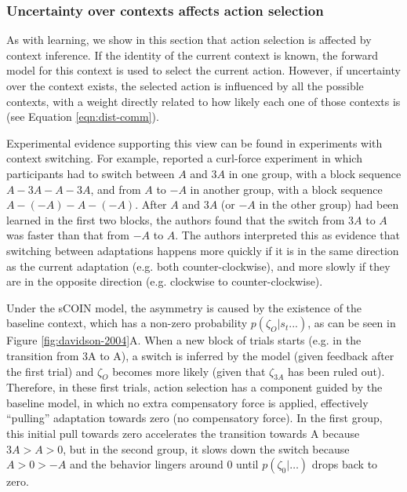 \documentclass[a4paper,doc,floatsintext,natbib]{apa6}
\def \fref #1{Figure \ref{#1}}     %
\def \eref #1{Equation \ref{#1}}   %
\begin{document}
\subsubsection{Uncertainty over contexts affects action selection}
As with learning, we show in this section that action selection is affected by context inference. If the identity of the current context is known, the forward model for this context is used to select the current action. However, if uncertainty over the context exists, the selected action is influenced by all the possible contexts, with a weight directly related to how likely each one of those contexts is (see \eref{eqn:dist-comm}).

Experimental evidence supporting this view can be found in experiments with context switching. For example, \cite{Davidson_Scaling_2004} reported a curl-force experiment in which participants had to switch between $A$ and $3A$ in one group, with a block sequence $A-3A-A-3A$, and from $A$ to $-A$ in another group, with a block sequence $A-(-A)-A-(-A)$. After $A$ and $3A$ (or $-A$ in the other group) had been learned in the first two blocks, the authors found that the switch from $3A$ to $A$ was faster than that from $-A$ to $A$. The authors interpreted this as evidence that switching between adaptations happens more quickly if it is in the same direction as the current adaptation (e.g. both counter-clockwise), and more slowly if they are in the opposite direction (e.g. clockwise to counter-clockwise).

Under the sCOIN model, the asymmetry is caused by the existence of the baseline context, which has a non-zero probability $p(\zeta_O | s_t ...)$, as can be seen in \fref{fig:davidson-2004}A. When a new block of trials starts (e.g. in the transition from 3A to A), a switch is inferred by the model (given feedback after the first trial) and $\zeta_O$ becomes more likely (given that $\zeta_{3A}$ has been ruled out). Therefore, in these first trials, action selection has a component guided by the baseline model, in which no extra compensatory force is applied, effectively ``pulling'' adaptation towards zero (no compensatory force). In the first group, this initial pull towards zero accelerates the transition towards A because $3A > A > 0$, but in the second group, it slows down the switch because $A > 0 > -A$ and the behavior lingers around $0$ until $p(\zeta_0|\ldots)$ drops back to zero.
\end{document}
